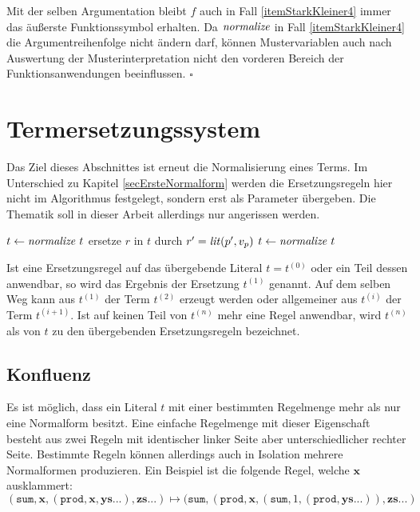 Mit der selben Argumentation bleibt $f$ auch in Fall \ref{itemStarkKleiner4} immer das äußerste Funktionssymbol erhalten. 
Da $\mathit{normalize}$ in Fall \ref{itemStarkKleiner4} die Argumentreihenfolge nicht ändern darf, können Mustervariablen auch nach Auswertung der Musterinterpretation nicht den vorderen Bereich der Funktionsanwendungen beeinflussen.  
\hfill $\square$\\



\section{Termersetzungssystem} \label{subsecTermersetzungssystem}

Das Ziel dieses Abschnittes ist erneut die Normalisierung eines Terms. Im Unterschied zu Kapitel \ref{secErsteNormalform} werden die Ersetzungsregeln hier nicht im Algorithmus festgelegt, sondern erst als Parameter übergeben. Die Thematik soll in dieser Arbeit allerdings nur angerissen werden.

\begin{algorithm}
\DontPrintSemicolon
\caption{$\Const{applyRuleset} \colon \mathit{Regelmenge} \times T \rightarrow T$ }\label{algoTES}
$t \leftarrow \mathit{normalize}~t$\;
 {
    ersetze $r$ in $t$ durch $r' = \mathit{lit}(p', v_p)$\;
    $t \leftarrow \mathit{normalize}~t$\;
}
\end{algorithm}

Ist eine Ersetzungsregel auf das übergebende Literal $t = t^{(0)}$ oder ein Teil dessen anwendbar, so wird das Ergebnis der Ersetzung $t^{(1)}$ genannt. Auf dem selben Weg kann aus $t^{(1)}$ der Term $t^{(2)}$ erzeugt werden oder allgemeiner aus $t^{(i)}$ der Term $t^{(i+1)}$. Ist auf keinen Teil von $t^{(n)}$ mehr eine Regel anwendbar, wird $t^{(n)}$ als  von $t$ zu den übergebenden Ersetzungsregeln bezeichnet. 



\subsection {Konfluenz} \label{subsubsecKonfluenz}
Es ist möglich, dass ein Literal $t$ mit einer bestimmten Regelmenge mehr als nur eine Normalform besitzt. Eine einfache Regelmenge mit dieser Eigenschaft besteht aus zwei Regeln mit identischer linker Seite aber unterschiedlicher rechter Seite. Bestimmte Regeln können allerdings auch in Isolation mehrere Normalformen produzieren. Ein Beispiel ist die folgende Regel, welche $\mathbf x$ ausklammert:
$$(\texttt{sum}, \mathbf x, (\texttt{prod}, \mathbf x, \mathbf{ys...}), \mathbf{zs...}) 
\mapsto (\texttt{sum}, (\texttt{prod}, \mathbf x, (\texttt{sum}, 1, (\texttt{prod}, \mathbf{ys...})) , \mathbf{zs...})$$

